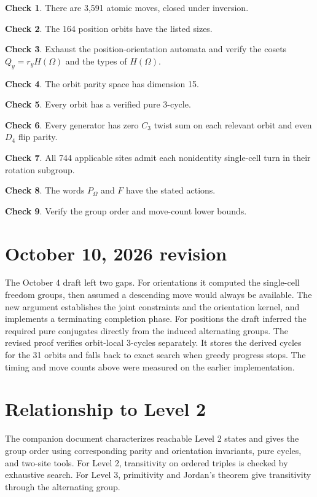 \documentclass[a4paper,11pt]{article}
\theoremstyle{definition}
\newtheorem{certcheck}{Check}
\newcommand{\code}[1]{\path{#1}}
\begin{document}
\begin{certcheck}There are 3,591 atomic moves, closed under inversion.\end{certcheck}
\begin{certcheck}The 164 position orbits have the listed sizes.\end{certcheck}
\begin{certcheck}Exhaust the position-orientation automata and verify the
cosets $Q_y=r_yH(\Omega)$ and the types of $H(\Omega)$.\end{certcheck}
\begin{certcheck}The orbit parity space has dimension 15.\end{certcheck}
\begin{certcheck}Every orbit has a verified pure 3-cycle.\end{certcheck}
\begin{certcheck}Every generator has zero $C_3$ twist sum on each relevant
orbit and even $D_4$ flip parity.\end{certcheck}
\begin{certcheck}All 744 applicable sites admit each nonidentity
single-cell turn in their rotation subgroup.\end{certcheck}
\begin{certcheck}The words $P_\Omega$ and $F$ have the stated actions.\end{certcheck}
\begin{certcheck}Verify the group order and move-count lower bounds.\end{certcheck}

\section{October 10, 2026 revision}
The October 4 draft left two gaps. For orientations it computed the
single-cell freedom groups, then assumed a descending move would always
be available. The new argument establishes the joint constraints and the
orientation kernel, and implements a terminating completion phase.
For positions the draft inferred the required pure conjugates directly
from the induced alternating groups. The revised proof verifies
orbit-local 3-cycles separately. It stores the derived cycles for the 31
orbits and falls back to exact search when greedy progress stops.
The timing and move counts above were measured on the earlier implementation.

\section{Relationship to Level 2}
The companion document \code{level2-completeness.tex} characterizes
reachable Level 2 states and gives the group order using corresponding
parity and orientation invariants, pure cycles, and two-site tools.
For Level 2, transitivity on ordered triples is checked by exhaustive
search. For Level 3, primitivity and Jordan's theorem give transitivity
through the alternating group.
\end{document}
